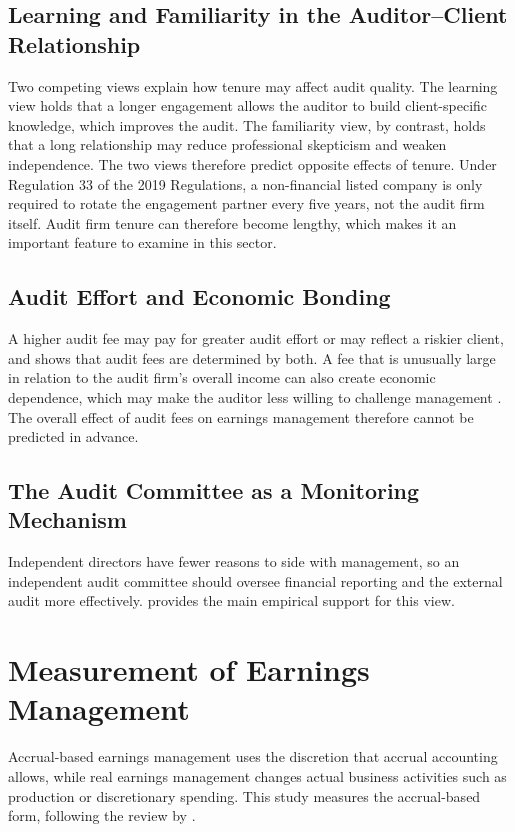 \subsection{Learning and Familiarity in the Auditor--Client Relationship}
\label{sec:learning}

Two competing views explain how tenure may affect audit quality. The learning view holds that a longer engagement allows the auditor to build client-specific knowledge, which improves the audit. The familiarity view, by contrast, holds that a long relationship may reduce professional skepticism and weaken independence. The two views therefore predict opposite effects of tenure. Under Regulation 33 of the 2019 Regulations, a non-financial listed company is only required to rotate the engagement partner every five years, not the audit firm itself. Audit firm tenure can therefore become lengthy, which makes it an important feature to examine in this sector.

\subsection{Audit Effort and Economic Bonding}
\label{sec:fees-theory}

A higher audit fee may pay for greater audit effort or may reflect a riskier client, and \textcite{simunic1980} shows that audit fees are determined by both. A fee that is unusually large in relation to the audit firm's overall income can also create economic dependence, which may make the auditor less willing to challenge management \parencite{choi2010}. The overall effect of audit fees on earnings management therefore cannot be predicted in advance.

\subsection{The Audit Committee as a Monitoring Mechanism}
\label{sec:committee-theory}

Independent directors have fewer reasons to side with management, so an independent audit committee should oversee financial reporting and the external audit more effectively. \textcite{klein2002} provides the main empirical support for this view.

\section{Measurement of Earnings Management}

Accrual-based earnings management uses the discretion that accrual accounting allows, while real earnings management changes actual business activities such as production or discretionary spending. This study measures the accrual-based form, following the review by \textcite{healy1999}.

